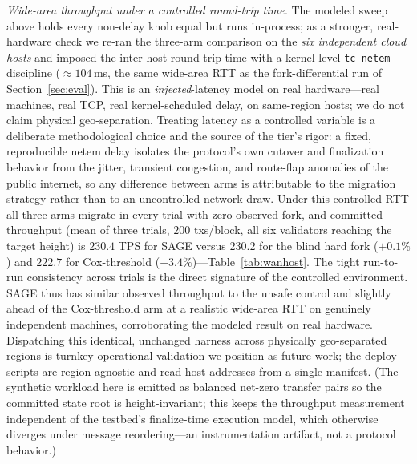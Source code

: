 \documentclass[journal]{IEEEtran}
\theoremstyle{definition}
\theoremstyle{remark}
\begin{document}
\emph{Wide-area throughput under a controlled round-trip time.} The modeled sweep above holds
every non-delay knob equal but runs in-process; as a stronger, real-hardware check we re-ran the
three-arm comparison on the \emph{six independent cloud hosts} and imposed the inter-host
round-trip time with a kernel-level \texttt{tc netem} discipline (${\approx}104$\,ms, the same
wide-area RTT as the fork-differential run of Section~\ref{sec:eval}). This is an
\emph{injected}-latency model on real hardware---real machines, real TCP, real kernel-scheduled
delay, on same-region hosts; we do not claim physical geo-separation. Treating latency as a
controlled variable is a deliberate methodological choice and the source of the tier's rigor: a
fixed, reproducible netem delay isolates the protocol's own cutover and finalization behavior from
the jitter, transient congestion, and route-flap anomalies of the public internet, so any
difference between arms is attributable to the migration strategy rather than to an uncontrolled
network draw. Under this controlled RTT all three arms migrate in every trial with zero observed
fork, and committed throughput (mean of three trials, $200$ txs/block, all six validators reaching
the target height) is $230.4$ TPS for SAGE versus $230.2$ for the blind hard fork ($+0.1\%$) and
$222.7$ for Cox-threshold ($+3.4\%$)---Table~\ref{tab:wanhost}. The tight run-to-run consistency
across trials is the direct signature of the controlled environment. SAGE thus has similar observed throughput to the unsafe control and slightly ahead of the Cox-threshold arm at
a realistic wide-area RTT on genuinely independent machines, corroborating the modeled result on
real hardware. Dispatching this identical, unchanged harness across physically geo-separated
regions is turnkey operational validation we position as future work; the deploy scripts are
region-agnostic and read host addresses from a single manifest. (The synthetic workload here is
emitted as balanced net-zero transfer pairs so the committed state root is height-invariant; this
keeps the throughput measurement independent of the testbed's finalize-time execution model, which
otherwise diverges under message reordering---an instrumentation artifact, not a protocol
behavior.)
\end{document}
